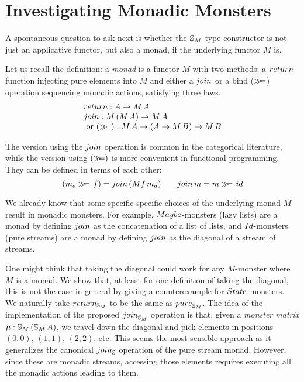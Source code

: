 \section{Investigating Monadic Monsters}\label{sec:monad}

A spontaneous question to ask next is whether the $\mathbb{S}_{M}$ type constructor is not just an applicative functor, but also a monad, if the underlying functor $M$ is.

Let us recall the definition: a {\em monad}
is a functor $M$ with two methods: a $\return$ function injecting pure elements into $M$ and either a $\join$ or a bind ($\mathbin{\gg\!\!=}$) operation sequencing monadic actions, satisfying three laws.
$$
\begin{array}{l}
\return : A \rightarrow M\, A \\
\join : M\,(M\, A) \rightarrow M\, A\\
\mbox{ or }
(\bind) : M\, A \rightarrow (A \rightarrow M\, B) \rightarrow M\, B
\end{array}
$$

The version using the $\join$ operation is common in the categorical literature, while the version using $(\mathbin{\gg\!\!=})$ is more convenient in functional programming.
They can be defined in terms of each other:
$$
(m_a \bind\, f) = \join \, (M f\, m_a) \qquad
\join\, m = m \bind\,\id
$$

We already know that some specific specific choices of the underlying monad $M$  result in monadic monsters.
For example, $\maybe$-monsters (lazy lists) are a monad by defining $\join$ as the concatenation of a list of lists, and $\Id$-monsters (pure streams) are a monad by defining $\join$ as the diagonal of a stream of streams.

One might think that taking the diagonal could work for any $M$-monster where $M$ is a monad. We show that, at least for one definition of taking the diagonal, this is not the case in general by giving a counterexample for $\state$-monsters.\\

We naturally take $\return_{\stream{M}}$ to be the same as $\apure_{\stream{M}}$.
The idea of the implementation of the proposed $\join_{\stream{M}}$ operation is that,
given a {\em monster matrix} $\mu:\mathbb{S}_{M}\,(\mathbb{S}_{M}\,A)$, we travel down the diagonal and pick elements in positions $(0,0)$, $(1,1)$, $(2,2)$, etc.
This seems the most sensible approach as it generalizes the canonical $\join_\strsym$ operation of the pure stream monad.
However, since these are monadic streams, accessing those elements requires executing all the monadic actions leading to them.

